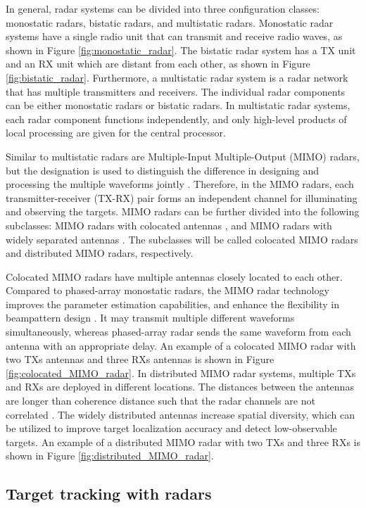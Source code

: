 \documentclass[english, 12pt, a4paper, elec, utf8, a-1b, online]{aaltothesis}
\begin{document}
In general, radar systems can be divided into three configuration classes: monostatic radars, bistatic radars, and multistatic radars.
Monostatic radar systems have a single radio unit that can transmit and receive radio waves, as shown in Figure \ref{fig:monostatic_radar}.
The bistatic radar system has a TX unit and an RX unit which are distant from each other, as shown in Figure \ref{fig:bistatic_radar}.
Furthermore, a multistatic radar system is a radar network that has multiple transmitters and receivers.
The individual radar components can be either monostatic radars or bistatic radars.
In multistatic radar systems, each radar component functions independently, and only high-level products of local processing are given for the central processor.

Similar to multistatic radars are Multiple-Input Multiple-Output (MIMO) radars, but the designation is used to distinguish the difference in designing and processing the multiple waveforms jointly \cite{Haimovich2008}.
Therefore, in the MIMO radars, each transmitter-receiver (TX-RX) pair forms an independent channel for illuminating and observing the targets.
MIMO radars can be further divided into the following subclasses: MIMO radars with colocated antennas \cite{Li2007}, and MIMO radars with widely separated antennas \cite{Haimovich2008}.
The subclasses will be called colocated MIMO radars and distributed MIMO radars, respectively.

Colocated MIMO radars have multiple antennas closely located to each other.
Compared to phased-array monostatic radars, the MIMO radar technology improves the parameter estimation capabilities, and enhance the flexibility in beampattern design \cite{Li2007}.
It may transmit multiple different waveforms simultaneously, whereas phased-array radar sends the same waveform from each antenna with an appropriate delay.
An example of a colocated MIMO radar with two TXs antennas and three RXs antennas is shown in Figure \ref{fig:colocated_MIMO_radar}.
In distributed MIMO radar systems, multiple TXs and RXs are deployed in different locations.
The distances between the antennas are longer than coherence distance such that the radar channels are not correlated \cite{Haimovich2008}.
The widely distributed antennas increase spatial diversity, which can be utilized to improve target localization accuracy and detect low-observable targets.
An example of a distributed MIMO radar with two TXs and three RXs is shown in Figure \ref{fig:distributed_MIMO_radar}.

\subsection{Target tracking with radars} \label{sec:Tracking}
\end{document}
